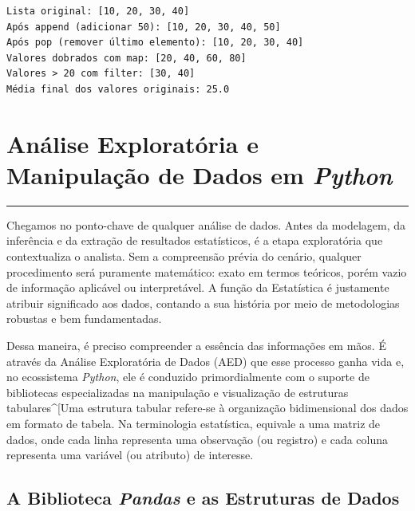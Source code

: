 \documentclass[
  brazilian,
  letterpaper,
  DIV=11,
  numbers=noendperiod]{scrreprt}
\begin{document}
\begin{verbatim}
Lista original: [10, 20, 30, 40]
Após append (adicionar 50): [10, 20, 30, 40, 50]
Após pop (remover último elemento): [10, 20, 30, 40]
Valores dobrados com map: [20, 40, 60, 80]
Valores > 20 com filter: [30, 40]
Média final dos valores originais: 25.0
\end{verbatim}


\chapter{\texorpdfstring{Análise Exploratória e Manipulação de Dados em
\emph{Python}}{Análise Exploratória e Manipulação de Dados em Python}}\label{anuxe1lise-exploratuxf3ria-e-manipulauxe7uxe3o-de-dados-em-python}

\begin{center}\rule{0.5\linewidth}{0.5pt}\end{center}

Chegamos no ponto-chave de qualquer análise de dados. Antes da
modelagem, da inferência e da extração de resultados estatísticos, é a
etapa exploratória que contextualiza o analista. Sem a compreensão
prévia do cenário, qualquer procedimento será puramente matemático:
exato em termos teóricos, porém vazio de informação aplicável ou
interpretável. A função da Estatística é justamente atribuir significado
aos dados, contando a sua história por meio de metodologias robustas e
bem fundamentadas.

Dessa maneira, é preciso compreender a essência das informações em mãos.
É através da Análise Exploratória de Dados (AED) que esse processo ganha
vida e, no ecossistema \emph{Python}, ele é conduzido primordialmente
com o suporte de bibliotecas especializadas na manipulação e
visualização de estruturas tabulares\^{}{[}Uma estrutura tabular
refere-se à organização bidimensional dos dados em formato de tabela. Na
terminologia estatística, equivale a uma matriz de dados, onde cada
linha representa uma observação (ou registro) e cada coluna representa
uma variável (ou atributo) de interesse.

\section{\texorpdfstring{A Biblioteca \emph{Pandas} e as Estruturas de
Dados}{A Biblioteca Pandas e as Estruturas de Dados}}\label{a-biblioteca-pandas-e-as-estruturas-de-dados}
\end{document}
